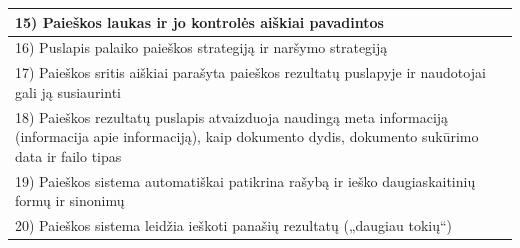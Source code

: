 \documentclass{VUMIFPSkursinis}
\begin{document}
\begin{center}
\begin{tabular}{ |p{}|p{2cm}| }
	15) Paieškos laukas ir jo kontrolės aiškiai pavadintos &  \\ \hline
	16) Puslapis palaiko paieškos strategiją ir naršymo strategiją &  \\ \hline
	17) Paieškos sritis aiškiai parašyta paieškos rezultatų puslapyje ir naudotojai gali ją susiaurinti &  \\ \hline
	18) Paieškos rezultatų puslapis atvaizduoja naudingą meta informaciją (informacija apie informaciją), kaip dokumento dydis, dokumento sukūrimo data ir failo tipas &  \\ \hline
	19) Paieškos sistema automatiškai patikrina rašybą ir ieško daugiaskaitinių formų ir sinonimų &  \\ \hline
	20) Paieškos sistema leidžia ieškoti panašių rezultatų („daugiau tokių“) &  \\ \hline
\end{tabular}
\label{paieškoslentelėpvz}
\end{center}
\end{document}
